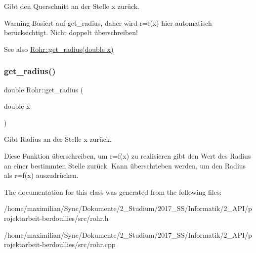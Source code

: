 Gibt den Querschnitt an der Stelle x zurück. 

\begin{DoxyWarning}{Warning}
Basiert auf get\+\_\+radius, daher wird r=f(x) hier automatisch berücksichtigt. Nicht doppelt überschreiben! 
\end{DoxyWarning}
\begin{DoxySeeAlso}{See also}
\hyperlink{class_rohr_a427e4ad6d350912715bd6796e385eaf3}{Rohr\+::get\+\_\+radius(double x)} 
\end{DoxySeeAlso}
\mbox{\label{class_rohr_a427e4ad6d350912715bd6796e385eaf3}} 
\subsubsection{\texorpdfstring{get\+\_\+radius()}{get\_radius()}}
{\footnotesize\ttfamily double Rohr\+::get\+\_\+radius (\begin{DoxyParamCaption}\item[{double}]{x }\end{DoxyParamCaption})}



Gibt Radius an der Stelle x zurück. 

Diese Funktion überschreiben, um r=f(x) zu realisieren gibt den Wert des Radius an einer bestimmten Stelle zurück. Kann überschrieben werden, um den Radius als r=f(x) auszudrücken.

The documentation for this class was generated from the following files\+:\begin{DoxyCompactItemize}
\item 
/home/maximilian/\+Sync/\+Dokumente/2\+\_\+\+Studium/2017\+\_\+\+S\+S/\+Informatik/2\+\_\+\+A\+P\+I/projektarbeit-\/berdoullies/src/rohr.\+h\item 
/home/maximilian/\+Sync/\+Dokumente/2\+\_\+\+Studium/2017\+\_\+\+S\+S/\+Informatik/2\+\_\+\+A\+P\+I/projektarbeit-\/berdoullies/src/rohr.\+cpp\end{DoxyCompactItemize}

